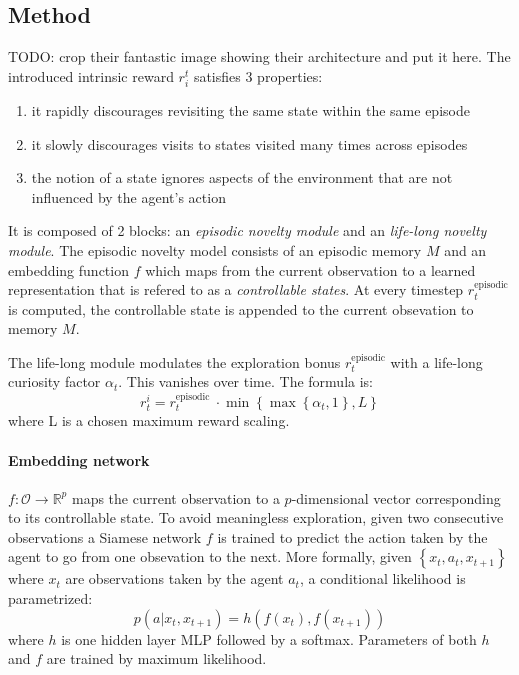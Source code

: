 \documentclass{article}
\begin{document}
\subsection{Method}
TODO: crop their fantastic image showing their architecture and put it here.
The introduced intrinsic reward $ r_{ i }^{ t }  $ satisfies 3 properties:
\begin{enumerate}
		\item it rapidly discourages revisiting the same state within the same episode
		\item it slowly discourages visits to states visited many times across episodes
		\item the notion of a state ignores aspects of the environment that are not influenced by the agent's action
\end{enumerate}
It is composed of 2 blocks:
an \textit{episodic novelty module} and an \textit{life-long novelty module}.
The episodic novelty model consists of an episodic memory $ M  $ and an embedding function $ f  $ which
maps from the current observation to a learned representation that is refered to as a \textit{controllable states}.
At every timestep $ r_{ t }^{ \text{episodic} }  $ is computed,
the controllable state is appended to the current obsevation to memory $ M  $.

The life-long module modulates the exploration bonus $ r_{ t }^{ \text{episodic} }  $ with a life-long
curiosity factor $ \alpha_{ t }  $. This vanishes over time.
The formula is:
\begin{equation}
		r^{ i }_{ t } = r_{ t }^{ \text{episodic } } \cdot \min \left\{ \max \left\{ \alpha_{ t }, 1 \right\}, L  \right\} 
\end{equation}
where L is a chosen maximum reward scaling.

\paragraph{Embedding network}
$ f: \mathcal{O} \to \mathbb{R}^{ p }  $ maps the current observation to a $ p  $-dimensional 
vector corresponding to its controllable state.
To avoid meaningless exploration, given two consecutive observations a Siamese network $ f  $
is trained to predict the action taken by the agent to go from one obsevation to the next.
More  formally, given $ \left\{ x_{ t }, a_{ t }, x_{ t+1 } \right\}   $ where $ x_{ t }  $
are observations taken by the agent $ a_{ t }  $, a conditional likelihood is parametrized:
\begin{equation}
		p (a|x_{ t }, x_{ t+1 }) = h ( f(x_{ t }), f (x_{ t+1 }))
\end{equation}
where $ h  $ is one hidden layer MLP followed by a softmax.
Parameters of both $ h  $ and $ f  $ are trained by maximum likelihood.
\end{document}
